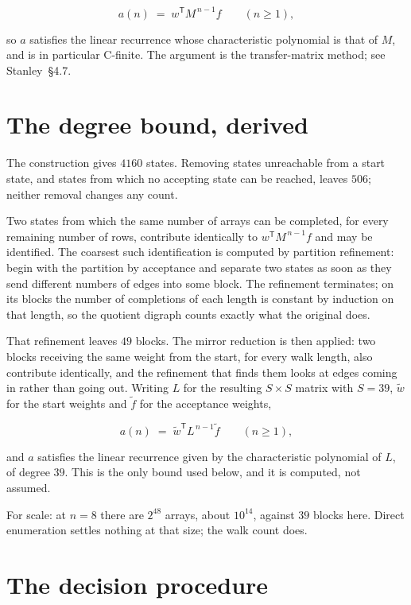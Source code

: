 \documentclass[11pt]{article}
\theoremstyle{definition}
\begin{document}
\[a(n) \;=\; w^{\mathsf T} M^{\,n-1} f \qquad (n \ge 1),\]

so $a$ satisfies the linear recurrence whose characteristic polynomial is that of $M$, and is in particular C-finite. The argument is the transfer-matrix method; see Stanley~\S4.7.

\section{The degree bound, derived}

The construction gives $4160$ states. Removing states unreachable from a start state, and states from which no accepting state can be reached, leaves $506$; neither removal changes any count.

Two states from which the same number of arrays can be completed, for every remaining number of rows, contribute identically to $w^{\mathsf T}M^{\,n-1}f$ and may be identified. The coarsest such identification is computed by partition refinement: begin with the partition by acceptance and separate two states as soon as they send different numbers of edges into some block. The refinement terminates; on its blocks the number of completions of each length is constant by induction on that length, so the quotient digraph counts exactly what the original does.

That refinement leaves $49$ blocks. The mirror reduction is then applied: two blocks receiving the same weight from the start, for every walk length, also contribute identically, and the refinement that finds them looks at edges coming in rather than going out. Writing $L$ for the resulting $S \times S$ matrix with $S = 39$, $\tilde w$ for the start weights and $\tilde f$ for the acceptance weights,

\[a(n) \;=\; \tilde w^{\mathsf T} L^{\,n-1} \tilde f \qquad (n \ge 1),\]

and $a$ satisfies the linear recurrence given by the characteristic polynomial of $L$, of degree $39$. This is the only bound used below, and it is computed, not assumed.

For scale: at $n = 8$ there are $2^{48}$ arrays, about $10^{14}$, against $39$ blocks here. Direct enumeration settles nothing at that size; the walk count does.

\section{The decision procedure}
\end{document}
